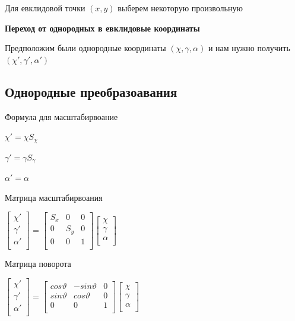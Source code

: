 \documentclass{article}
\begin{document}
    Для евклидовой точки $(x,y)$ выберем некоторую произвольную


    \textbf{ Переход от однородных в евклидовые координаты}

    Предположим были однородные координаты $(\chi, \gamma, \alpha)$ 
    и нам нужно получить $(\chi ', \gamma ', \alpha ')$

    \subsection{Однородные преобразоавания}

    Формула для масштабирвоание 

    $\chi ' = \chi S_\chi$

    $\gamma ' = \gamma S_\gamma$

    $\alpha ' = \alpha$

    Матрица масштабирвоания 

    $\begin{bmatrix}
        \chi' \\
        \gamma ' \\ 
        \alpha ' \\

    \end{bmatrix}
    =
    \begin{bmatrix}
        S_x & 0  & 0 \\[0.3em]
        0 & S_y  & 0 \\[0.3em]
        0 & 0  & 1 \\[0.3em]
    \end{bmatrix}
    \begin{bmatrix}
        \chi \\
        \gamma  \\ 
        \alpha  \\
    \end{bmatrix}$


    Матрица поворота


    $\begin{bmatrix}
        \chi' \\
        \gamma ' \\ 
        \alpha ' \\

    \end{bmatrix}
    =
    \begin{bmatrix}
        cos \vartheta & -sin \vartheta  & 0 \\[0.3em]
        sin \vartheta &  cos \vartheta  & 0 \\[0.3em]
        0 & 0  & 1 \\[0.3em]
    \end{bmatrix}
    \begin{bmatrix}
        \chi \\
        \gamma  \\ 
        \alpha  \\
    \end{bmatrix}$
\hspace{5mm}
\end{document}
